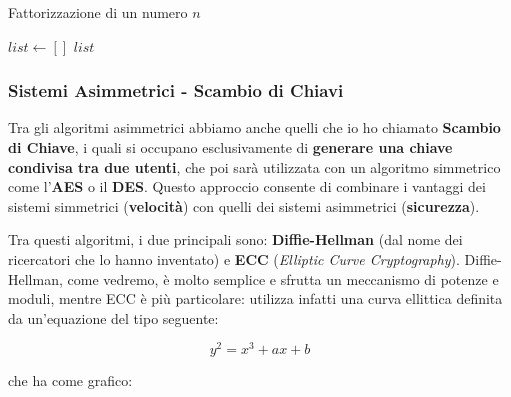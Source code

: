 \documentclass{report}
\begin{document}
\vspace{0.5cm}


\begin{algorithm}[H]
\caption{Fattorizzazione di un numero $n$}
$list \gets []$\;
\Return $list$\;
\end{algorithm}


\newpage

\subsubsection{Sistemi Asimmetrici - Scambio di Chiavi}
Tra gli algoritmi asimmetrici abbiamo anche quelli che io ho chiamato \textbf{Scambio di Chiave}, i quali si occupano esclusivamente di \textbf{generare una chiave condivisa tra due utenti}, che poi sarà utilizzata con un algoritmo simmetrico come l'\textbf{AES} o il \textbf{DES}. Questo approccio consente di combinare i vantaggi dei sistemi simmetrici (\textbf{velocità}) con quelli dei sistemi asimmetrici (\textbf{sicurezza}).


Tra questi algoritmi, i due principali sono: \textbf{Diffie-Hellman} (dal nome dei ricercatori che lo hanno inventato) e \textbf{ECC} (\textit{Elliptic Curve Cryptography}). Diffie-Hellman, come vedremo, è molto semplice e sfrutta un meccanismo di potenze e moduli, mentre ECC è più particolare: utilizza infatti una curva ellittica definita da un’equazione del tipo seguente:


\begin{equation*}
    y^2 = x^3 + ax + b    
\end{equation*}

che ha come grafico:


\begin{figure}[h!]
\centering
{}
\end{figure}
\end{document}
